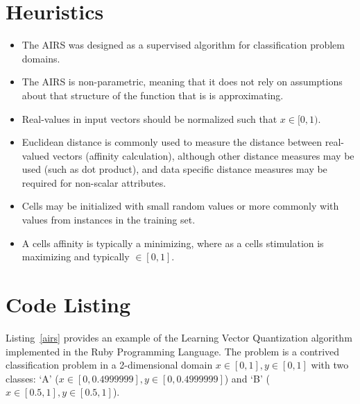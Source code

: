 \documentclass[a4paper, 11pt]{article}
\begin{document}
\section{Heuristics}
\label{sec:heuristics}
\begin{itemize}
	\item The AIRS was designed as a supervised algorithm for classification problem domains.
	\item The AIRS is non-parametric, meaning that it does not rely on assumptions about that structure of the function that is is approximating.
	\item Real-values in input vectors should be normalized such that $x \in [0,1)$. 
	\item Euclidean distance is commonly used to measure the distance between real-valued vectors (affinity calculation), although other distance measures may be used (such as dot product), and data specific distance measures may be required for non-scalar attributes.
	\item Cells may be initialized with small random values or more commonly with values from instances in the training set.
	\item A cells affinity is typically a minimizing, where as a cells stimulation is maximizing and typically $\in [0,1]$.
\end{itemize}

\section{Code Listing}
\label{sec:code}
Listing~\ref{airs} provides an example of the Learning Vector Quantization algorithm implemented in the Ruby Programming Language. 
The problem is a contrived classification problem in a 2-dimensional domain $x\in[0,1], y\in[0,1]$ with two classes: `A' ($x\in[0,0.4999999], y\in[0,0.4999999]$) and `B' ($x\in[0.5,1], y\in[0.5,1]$).
\end{document}
